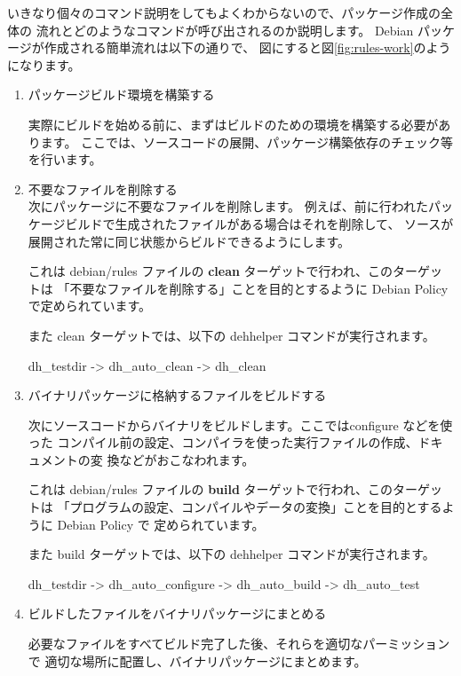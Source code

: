 \documentclass[mingoth,a4paper]{jsarticle}
\begin{document}
いきなり個々のコマンド説明をしてもよくわからないので、パッケージ作成の全体の
流れとどのようなコマンドが呼び出されるのか説明します。
Debian パッケージが作成される簡単流れは以下の通りで、
図にすると図\ref{fig:rules-work}のようになります。

\begin{enumerate}
\item パッケージビルド環境を構築する

実際にビルドを始める前に、まずはビルドのための環境を構築する必要があります。
ここでは、ソースコードの展開、パッケージ構築依存のチェック等を行います。

\item 不要なファイルを削除する\\
次にパッケージに不要なファイルを削除します。 
例えば、前に行われたパッケージビルドで生成されたファイルがある場合はそれを削除して、 
ソースが展開された常に同じ状態からビルドできるようにします。 

これは debian/rules ファイルの {\bf clean} ターゲットで行われ、このターゲットは
「不要なファイルを削除する」ことを目的とするように Debian Policy で定められています。

また clean ターゲットでは、以下の dehhelper コマンドが実行されます。
\begin{commandline}
dh_testdir -> dh_auto_clean -> dh_clean
\end{commandline}

\item  バイナリパッケージに格納するファイルをビルドする

次にソースコードからバイナリをビルドします。ここではconfigure などを使った
コンパイル前の設定、コンパイラを使った実行ファイルの作成、ドキュメントの変
換などがおこなわれます。

これは debian/rules ファイルの {\bf build} ターゲットで行われ、このターゲットは
「プログラムの設定、コンパイルやデータの変換」ことを目的とするように Debian Policy で
定められています。

また build ターゲットでは、以下の dehhelper コマンドが実行されます。
\begin{commandline}
dh_testdir -> dh_auto_configure -> dh_auto_build -> dh_auto_test
\end{commandline}

\item ビルドしたファイルをバイナリパッケージにまとめる

必要なファイルをすべてビルド完了した後、それらを適切なパーミッションで
適切な場所に配置し、バイナリパッケージにまとめます。 


\end{enumerate}
\end{document}
